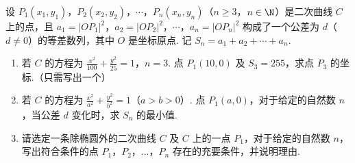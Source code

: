 \begin{problem}
设 \(P_{1}(x_{1},y_{1})\)，\(P_{2}(x_{2},y_{2})\)，\(\cdots\)，\(P_{n}(x_{n},y_{n})\)（\(n \geqslant 3\)，\(n \in \N\)）是二次曲线 \(C\) 上的点，且 \(a_{1} = |OP_{1}|^{2}\)，\(a_{2} = |OP_{2}|^{2}\)，\(\cdots\)，\(a_{n} = |OP_{n}|^{2}\) 构成了一个公差为 \(d\)（\(d \neq 0\)）的等差数列，其中 \(O\) 是坐标原点. 记 \(S_{n} = a_{1} + a_{2} + \cdots + a_{n}\).

\begin{enumerate}
\item 若 \(C\) 的方程为 \(\frac{x^2}{100} + \frac{y^2}{25} = 1\)，\(n = 3\). 点 \(P_1(10,0)\) 及 \(S_3 = 255\)，求点 \(P_3\) 的坐标.（只需写出一个）
\item 若 \(C\) 的方程为 \(\frac{x^2}{a^2} + \frac{y^2}{b^2} = 1\)（\(a > b > 0\)）. 点 \(P_1(a,0)\)，对于给定的自然数 \(n\)，当公差 \(d\) 变化时，求 \(S_n\) 的最小值.

\item 请选定一条除椭圆外的二次曲线 \(C\) 及 \(C\) 上的一点 \(P_1\)，对于给定的自然数 \(n\)，写出符合条件的点 \(P_1\)，\(P_2\)，\(\ldots\)，\(P_n\) 存在的充要条件，并说明理由.
\end{enumerate}
\end{problem}

